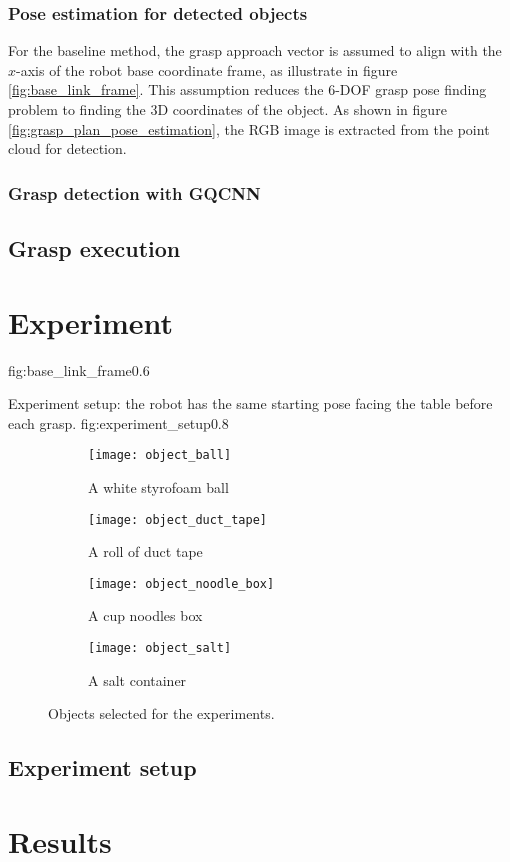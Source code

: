 \subsubsection*{Pose estimation for detected objects}

For the baseline method, the grasp approach vector is assumed to align with the $ x $-axis of the robot base coordinate
frame, as illustrate in figure \ref{fig:base_link_frame}. This assumption reduces the 6-DOF grasp pose finding problem
to finding the 3D coordinates of the object. As shown in figure \ref{fig:grasp_plan_pose_estimation}, the RGB image is
extracted from the point cloud for detection.

\subsubsection*{Grasp detection with GQCNN}

\subsection{Grasp execution}

\pagebreak
\section{Experiment}

             {fig:base_link_frame}{0.6\textwidth}

             {Experiment setup: the robot has the same starting pose facing the table before each grasp.}
             {fig:experiment_setup}{0.8\textwidth}

\begin{figure}[htb]
    \centering
    \small
    \begin{subfigure}[b]{0.45\textwidth}
        \texttt{[image: object\_ball]}
        \caption{A white styrofoam ball}
        \label{fig:object_ball}
    \end{subfigure}
    \hfill
    \begin{subfigure}[b]{0.45\textwidth}
        \texttt{[image: object\_duct\_tape]}
        \caption{A roll of duct tape}
        \label{fig:object_duct_tape}
    \end{subfigure}

    \begin{subfigure}[b]{0.45\textwidth}
        \texttt{[image: object\_noodle\_box]}
        \caption{A cup noodles box}
        \label{fig:object_noodle_box}
    \end{subfigure}
    \hfill
    \begin{subfigure}[b]{0.45\textwidth}
    \texttt{[image: object\_salt]}
    \caption{A salt container}
    \label{fig:object_salt}
    \end{subfigure}
    \caption{Objects selected for the experiments.}\label{fig:objects}
\end{figure}

\subsection{Experiment setup}


\section{Results}


